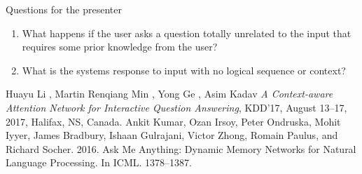 \documentclass[12pt]{article}
\theoremstyle{remark}
\begin{document}
\vspace{0.25cm}
Questions for the presenter
\begin{enumerate}
	\item What happens if the user asks a question totally unrelated to the input that requires some prior knowledge from the user?
	\item What is the systems response to input with no logical sequence or context?
\end{enumerate}

\begin{thebibliography}{unsrt}
	Huayu Li , Martin Renqiang Min , Yong Ge , Asim Kadav \emph{A Context-aware Attention Network for Interactive Question Answering}, KDD’17, August 13–17, 2017, Halifax, NS, Canada.
	Ankit Kumar, Ozan Irsoy, Peter Ondruska, Mohit Iyyer, James Bradbury, Ishaan
	Gulrajani, Victor Zhong, Romain Paulus, and Richard Socher. 2016. Ask Me
	Anything: Dynamic Memory Networks for Natural Language Processing. In
	ICML. 1378–1387.
\end{thebibliography}
\end{document}
